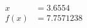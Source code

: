 \documentclass[preview]{standalone}
\begin{document}
\begin{align*}
x &= 3.6554\\f(x) &= 7.7571238
\end{align*}
\end{document}
